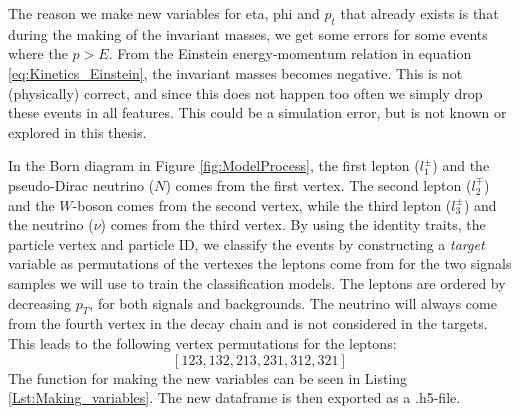\documentclass[a4paper, american, 12pt]{report}
\begin{document}
	The reason we make new variables for eta, phi and $p_t$ that already exists is that during the making of the invariant masses, we get some errors for some events where the $p>E$. From the Einstein energy-momentum relation in equation \ref{eq:Kinetics_Einstein}, the invariant masses becomes negative. This is not (physically) correct, and since this does not happen too often we simply drop these events in all features. This could be a simulation error, but is not known or explored in this thesis.
	
	In the Born diagram in Figure \ref{fig:ModelProcess}, the first lepton ($l_1^{\pm}$) and the pseudo-Dirac neutrino ($N$) comes from the first vertex. The second lepton ($l_2^{\mp}$) and the $W$-boson comes from the second vertex, while the third lepton ($l_3^{\pm}$) and the neutrino ($\nu$) comes from the third vertex. By using the identity traits, the particle vertex and particle ID, we classify the events by constructing a \textit{target} variable as permutations of the vertexes the leptons come from for the two signals samples we will use to train the classification models. The leptons are ordered by decreasing $p_T$, for both signals and backgrounds. The neutrino will always come from the fourth vertex in the decay chain and is not considered in the targets. This leads to the following vertex permutations for the leptons: 
	\begin{equation}
		\label{eq:Permutations}
		[123, 132, 213, 231, 312, 321]
	\end{equation}
	The function for making the new variables can be seen in Listing \ref{Lst:Making_variables}. The new dataframe is then exported as a .h5-file. 
\end{document}
